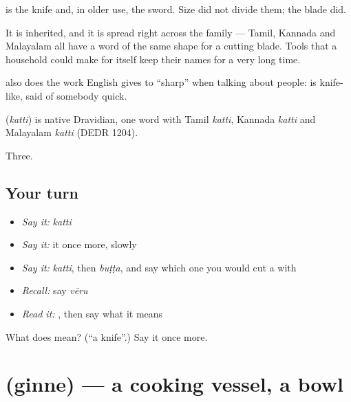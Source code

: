  is the knife and, in older use, the sword. Size did not divide them; the blade did.

It is inherited, and it is spread right across the family — Tamil, Kannada and Malayalam all have a word of the same shape for a cutting blade. Tools that a household could make for itself keep their names for a very long time.

 also does the work English gives to \textquotedblleft{}sharp\textquotedblright{} when talking about people:  is knife-like, said of somebody quick.

\begin{cousinweb}
\textbf{} (\emph{katti}) is native Dravidian, one word with Tamil \emph{katti}, Kannada \emph{katti} and Malayalam \emph{katti} (DEDR 1204).
\end{cousinweb}

\begin{grammarlens}[title={What you've built}]
Three.
\end{grammarlens}

\subsection*{Your turn}
\begin{itemize}
\raggedright
  \item \emph{Say it:} \emph{katti}
  \item \emph{Say it:} it once more, slowly
  \item \emph{Say it:} \emph{katti}, then \emph{buṭṭa}, and say which one you would cut a  with
  \item \emph{Recall:} say \emph{vēru}
  \item \emph{Read it:} \textbf{}, then say what it means
\end{itemize}

\begin{tcolorbox}[breakable,colback=teal!4,colframe=teal!35!black,title={Before you move on}]
What does  mean? (\textquotedblleft{}a knife\textquotedblright{}.) Say it once more.
\end{tcolorbox}
\section[\texorpdfstring{\te{గిన్నె} (ginne)}{గిన్నె (ginne)}]{ (ginne) — a cooking vessel, a bowl}

\label{lesson:TE-C56-vessel}



